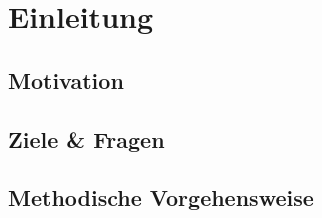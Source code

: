 \chapter{Einleitung}\label{chap:intro}
\section{Motivation}
\section{Ziele \& Fragen}
\section{Methodische Vorgehensweise}
